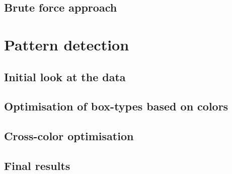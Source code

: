 \documentclass{beamer}
\begin{document}
\subsection{Brute force approach}


\section{Pattern detection}


\subsection{Initial look at the data}


\subsection{Optimisation of box-types based on colors}



\subsection{Cross-color optimisation}


\subsection{Final results}

\end{document}
